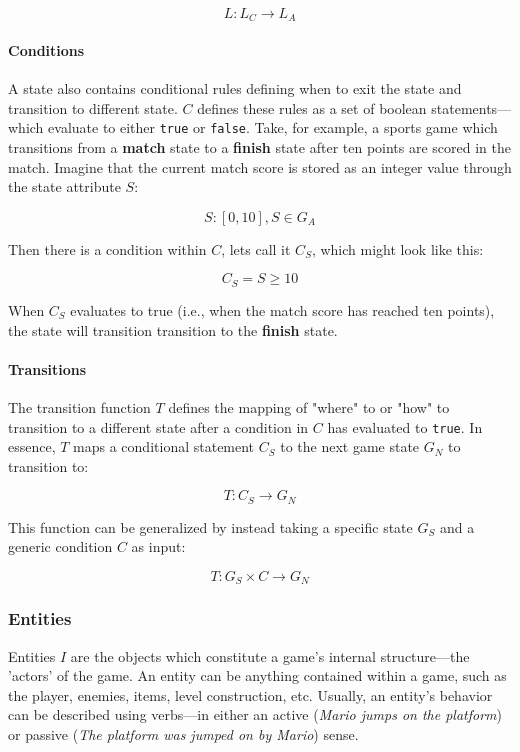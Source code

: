 \documentclass{report}
\begin{document}
$$L: L_C \longrightarrow L_A$$


\paragraph{Conditions}
A state also contains conditional rules defining when to exit the state and transition to different state. $C$ defines these rules as a set of boolean statements---which evaluate to either \texttt{true} or \texttt{false}.
Take, for example, a sports game which transitions from a \textbf{match} state to a \textbf{finish} state after ten points are scored in the match. Imagine that the current match score is stored as an integer value through the state attribute $S$: 

$$
S: [0, 10],  S \in G_A
$$

Then there is a condition within $C$, lets call it $C_S$, which might look like this:

$$
C_S = S\geq10 
$$

When $C_S$ evaluates to true (i.e., when the match score has reached ten points), the state will transition transition to the \textbf{finish} state.

\paragraph{Transitions}
The transition function $T$ defines the mapping of "where" to or "how" to transition to a different state after a condition in $C$ has evaluated to \texttt{true}. In essence, $T$ maps a conditional statement $C_S$ to the next game state $G_N$ to transition to:

$$
T: C_S \longrightarrow G_N
$$

This function can be generalized by instead taking a specific state $G_S$ and a generic condition $C$ as input:

$$
T: G_S \times C \longrightarrow G_N
$$

\subsubsection{Entities}
Entities $I$ are the objects which constitute a game's internal structure---the 'actors' of the game. An entity can be anything contained within a game, such as the player, enemies, items, level construction, etc.  Usually, an entity's behavior can be described using verbs---in either an active (\emph{Mario jumps on the platform}) or passive (\emph{The platform was jumped on by Mario}) sense.
\end{document}
